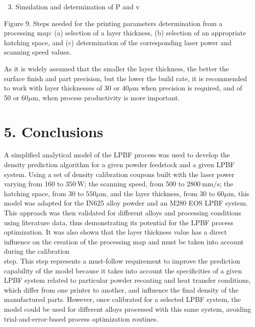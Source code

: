 \documentclass[10pt]{article}
\begin{document}
\begin{enumerate}
  \setcounter{enumi}{2}
  \item Simulation and determination of $\mathrm{P}$ and $\mathrm{v}$
\end{enumerate}

Figure 9. Steps needed for the printing parameters determination from a processing map: (a) selection of a layer thickness, (b) selection of an appropriate hatching space, and (c) determination of the corresponding laser power and scanning speed values.

As it is widely assumed that the smaller the layer thickness, the better the surface finish and part precision, but the lower the build rate, it is recommended to work with layer thicknesses of 30 or $40 \mu \mathrm{m}$ when precision is required, and of 50 or $60 \mu \mathrm{m}$, when process productivity is more important.

\section*{5. Conclusions}
A simplified analytical model of the LPBF process was used to develop the density prediction algorithm for a given powder feedstock and a given LPBF system. Using a set of density calibration coupons built with the laser power varying from 160 to $350 \mathrm{~W}$; the scanning speed, from 500 to $2800 \mathrm{~mm} / \mathrm{s}$; the hatching space, from 30 to $550 \mu \mathrm{m}$, and the layer thickness, from 30 to $60 \mu \mathrm{m}$, this model was adapted for the IN625 alloy powder and an M280 EOS LPBF system. This approach was then validated for different alloys and processing conditions using literature data, thus demonstrating its potential for the LPBF process optimization. It was also shown that the layer thickness value has a direct influence on the creation of the processing map and must be taken into account during the calibration\\
step. This step represents a must-follow requirement to improve the prediction capability of the model because it takes into account the specificities of a given LPBF system related to particular powder recoating and heat transfer conditions, which differ from one printer to another, and influence the final density of the manufactured parts. However, once calibrated for a selected LPBF system, the model could be used for different alloys processed with this same system, avoiding trial-and-error-based process optimization routines.
\end{document}
